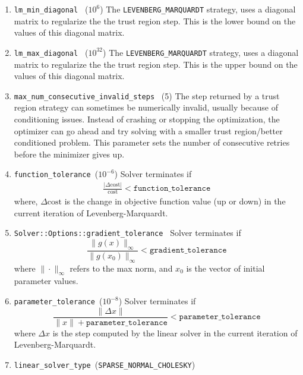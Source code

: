 \begin{enumerate}
\item{\texttt{lm\_min\_diagonal } ($10^6$)} The \texttt{LEVENBERG\_MARQUARDT} strategy, uses a diagonal matrix to regularize the the trust region step. This is the lower bound on the values of this diagonal matrix.

\item{\texttt{lm\_max\_diagonal } ($10^{32}$)}  The \texttt{LEVENBERG\_MARQUARDT} strategy, uses a diagonal matrix to regularize the the trust region step. This is the upper bound on the values of this diagonal matrix.

\item{\texttt{max\_num\_consecutive\_invalid\_steps } (5)} The step returned by a trust region strategy can sometimes be numerically invalid, usually because of conditioning issues. Instead of crashing or stopping the optimization, the optimizer can go ahead and try solving with a smaller trust region/better conditioned problem. This parameter sets the number of consecutive retries before the minimizer gives up.

\item{\texttt{function\_tolerance }}($10^{-6}$) Solver terminates if
\begin{align}
\frac{|\Delta \text{cost}|}{\text{cost}} < \texttt{function\_tolerance}
\end{align}
where, $\Delta \text{cost}$ is the change in objective function value (up or down) in the current iteration of Levenberg-Marquardt.

\item \texttt{Solver::Options::gradient\_tolerance } Solver terminates if 
\begin{equation}
    \frac{\|g(x)\|_\infty}{\|g(x_0)\|_\infty} < \texttt{gradient\_tolerance}
\end{equation}
where $\|\cdot\|_\infty$ refers to the max norm, and $x_0$ is the vector of initial parameter values.

\item{\texttt{parameter\_tolerance }}($10^{-8}$) Solver terminates if 
\begin{equation}
    \frac{\|\Delta x\|}{\|x\| + \texttt{parameter\_tolerance}} < \texttt{parameter\_tolerance}
\end{equation}
where $\Delta x$ is the step computed by the linear solver in the current iteration of Levenberg-Marquardt.

\item{\texttt{linear\_solver\_type }(\texttt{SPARSE\_NORMAL\_CHOLESKY})}


\end{enumerate}
